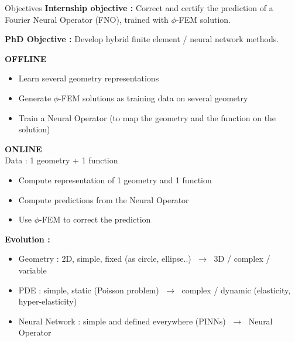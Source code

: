 \begin{frame}{Objectives}
    \textbf{Internship objective :} Correct and certify the prediction of a Fourier Neural Operator (FNO), trained with $\phi$-FEM solution.

    \vspace{5pt}

    \textbf{PhD Objective :} Develop hybrid finite element / neural network methods.
    \small
    \begin{center}
        \begin{minipage}[t]{0.49\linewidth}
               \centering\textbf{OFFLINE}
               \begin{itemize}
                   \item Learn several geometry representations
                   \item Generate $\phi$-FEM solutions as training data on several geometry
                   \item Train a Neural Operator (to map the geometry and the function on the solution)
               \end{itemize}
           \end{minipage} \hfill\vline\hfill \begin{minipage}[t]{0.49\linewidth}
               \centering\textbf{ONLINE} \\
               Data : 1 geometry + 1 function
               \begin{itemize}
                   \item Compute representation of 1 geometry and 1 function
                   \item Compute predictions from the Neural Operator
                   \item Use $\phi$-FEM to correct the prediction
               \end{itemize}
           \end{minipage}
    \end{center}

    \vspace{5pt}

    \normalsize

    \textbf{Evolution :}

    \small
    \begin{itemize}
        \item Geometry : 2D, simple, fixed (as circle, ellipse..) $ \; \rightarrow \;$ 3D / complex / variable
        \item PDE : simple, static (Poisson problem) $\; \rightarrow \;$ complex / dynamic (elasticity, hyper-elasticity)
        \item Neural Network : simple and defined everywhere (PINNs) $\; \rightarrow \;$ Neural Operator
    \end{itemize}
    

\end{frame}

